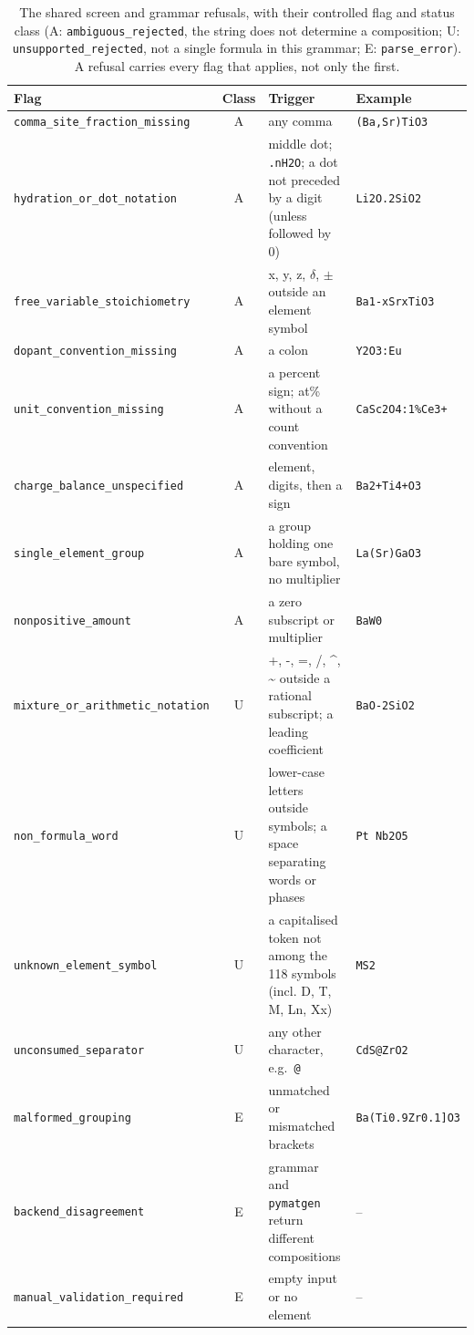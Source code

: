 \begin{table}[!t]
\centering
\caption{The shared screen and grammar refusals, with their controlled flag and status class (A: \texttt{ambiguous\_rejected}, the string does not determine a composition; U: \texttt{unsupported\_rejected}, not a single formula in this grammar; E: \texttt{parse\_error}). A refusal carries every flag that applies, not only the first.}
\label{tab:rules}
\footnotesize
\setlength{\tabcolsep}{4pt}
\begin{tabular}{@{}lcp{8.2cm}l@{}}
\toprule
Flag & Class & Trigger & Example \\
\midrule
\texttt{comma\_site\_fraction\_missing} & A & any comma & \texttt{(Ba,Sr)TiO3} \\
\texttt{hydration\_or\_dot\_notation} & A & middle dot; \texttt{.nH2O}; a dot not preceded by a digit (unless followed by 0) & \texttt{Li2O.2SiO2} \\
\texttt{free\_variable\_stoichiometry} & A & x, y, z, $\delta$, $\pm$ outside an element symbol & \texttt{Ba1-xSrxTiO3} \\
\texttt{dopant\_convention\_missing} & A & a colon & \texttt{Y2O3:Eu} \\
\texttt{unit\_convention\_missing} & A & a percent sign; at\% without a count convention & \texttt{CaSc2O4:1\%Ce3+} \\
\texttt{charge\_balance\_unspecified} & A & element, digits, then a sign & \texttt{Ba2+Ti4+O3} \\
\texttt{single\_element\_group} & A & a group holding one bare symbol, no multiplier & \texttt{La(Sr)GaO3} \\
\texttt{nonpositive\_amount} & A & a zero subscript or multiplier & \texttt{BaW0} \\
\texttt{mixture\_or\_arithmetic\_notation} & U & +, -, =, /, \textasciicircum, \textasciitilde{} outside a rational subscript; a leading coefficient & \texttt{BaO-2SiO2} \\
\texttt{non\_formula\_word} & U & lower-case letters outside symbols; a space separating words or phases & \texttt{Pt Nb2O5} \\
\texttt{unknown\_element\_symbol} & U & a capitalised token not among the 118 symbols (incl. D, T, M, Ln, Xx) & \texttt{MS2} \\
\texttt{unconsumed\_separator} & U & any other character, e.g.\ \texttt{@} & \texttt{CdS@ZrO2} \\
\texttt{malformed\_grouping} & E & unmatched or mismatched brackets & \texttt{Ba(Ti0.9Zr0.1]O3} \\
\texttt{backend\_disagreement} & E & grammar and \texttt{pymatgen} return different compositions & -- \\
\texttt{manual\_validation\_required} & E & empty input or no element & -- \\
\bottomrule
\end{tabular}
\end{table}
